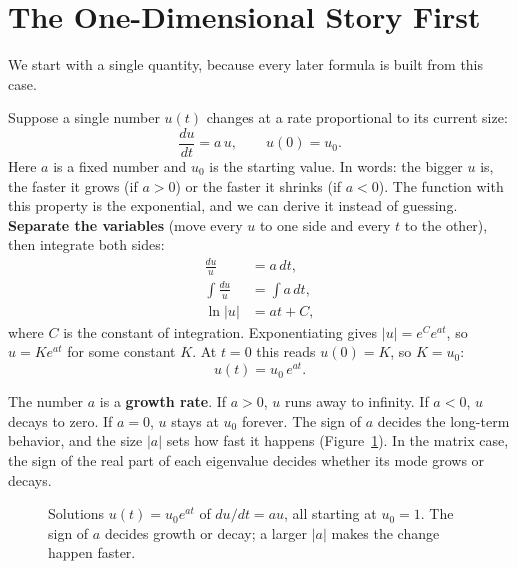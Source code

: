 \section{The One-Dimensional Story First}
\label{ch25:scalar}

We start with a single quantity, because every later formula is built from
this case.

Suppose a single number $u(t)$ changes at a rate proportional to its current
size:
\[
  \frac{du}{dt} = a\,u, \qquad u(0) = u_0.
\]
Here $a$ is a fixed number and $u_0$ is the starting value. In words: the
bigger $u$ is, the faster it grows (if $a > 0$) or the faster it shrinks (if
$a < 0$). The function with this property is the exponential, and we can
derive it instead of guessing. \textbf{Separate the variables} (move every $u$
to one side and every $t$ to the other), then integrate both sides:
\begin{align*}
  \frac{du}{u} &= a\,dt,\\
  \int \frac{du}{u} &= \int a\,dt,\\
  \ln|u| &= a t + C,
\end{align*}
where $C$ is the constant of integration. Exponentiating gives
$|u| = e^{C}e^{at}$, so $u = K e^{at}$ for some constant $K$. At $t=0$ this
reads $u(0) = K$, so $K = u_0$:
\[
  \boxed{\,u(t) = u_0\, e^{a t}.\,}
\]

\begin{intuitionbox}
The number $a$ is a \textbf{growth rate}. If $a > 0$, $u$ runs away to infinity.
If $a < 0$, $u$ decays to zero. If $a = 0$, $u$ stays at $u_0$ forever. The
sign of $a$ decides the long-term behavior, and the size $|a|$ sets how fast it
happens (Figure~\ref{ch25:fig-scalar}).
In the matrix case, the sign of the real part of each eigenvalue decides
whether its mode grows or decays.
\end{intuitionbox}

\begin{figure}[htbp]
\centering
{}
\caption{Solutions $u(t)=u_0e^{at}$ of $du/dt=au$, all starting at $u_0=1$. The
sign of $a$ decides growth or decay; a larger $|a|$ makes the change happen
faster.}
\label{ch25:fig-scalar}
\end{figure}

